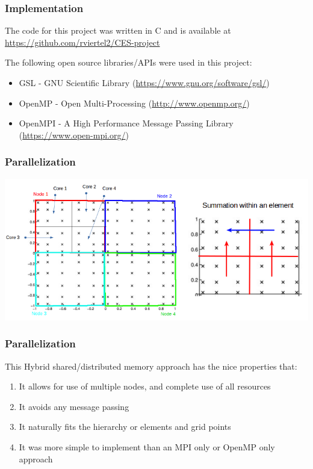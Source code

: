 \documentclass{beamer}
\theoremstyle{plain}
\theoremstyle{definition}
\begin{document}
\begin{frame}\frametitle{Implementation}
  The code for this project was written in C and is available at \href{https://github.com/rviertel2/CES-project}{https://github.com/rviertel2/CES-project}\\

  \vspace{1em}

  The following open source libraries/APIs were used in this project:
  \begin{itemize}
    \item GSL - GNU Scientific Library (\href{https://www.gnu.org/software/gsl/}{https://www.gnu.org/software/gsl/})
    \item OpenMP - Open Multi-Processing (\href{http://www.openmp.org/}{http://www.openmp.org/})
    \item OpenMPI - A High Performance Message Passing Library (\href{https://www.open-mpi.org/}{https://www.open-mpi.org/})
  \end{itemize}
\end{frame}

\begin{frame}\frametitle{Parallelization}
  \begin{center}
    \includegraphics[scale=.42]{parallel.png}%
  \end{center}
\end{frame}

\begin{frame}\frametitle{Parallelization}
  This Hybrid shared/distributed memory approach has the nice properties that:
  \begin{enumerate}
    \item It allows for use of multiple nodes, and complete use of all resources
    \item It avoids any message passing
    \item It naturally fits the hierarchy or elements and grid points
    \item It was more simple to implement than an MPI only or OpenMP only approach
  \end{enumerate}
\end{frame}
\end{document}
